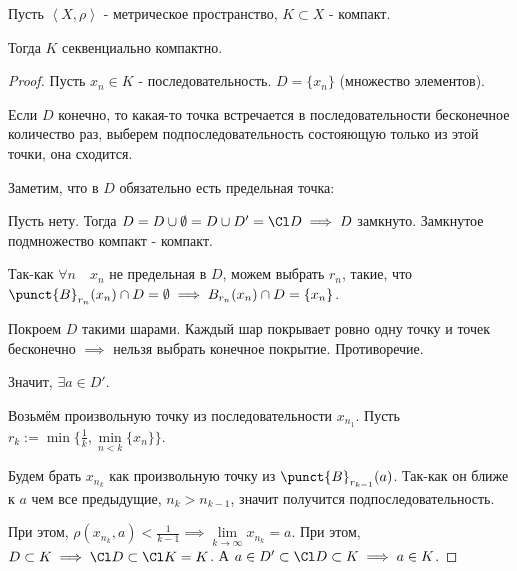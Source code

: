 \begin{theorem} \thmslashn

    Пусть $\left<X, \rho\right>$ - метрическое пространство, $K \subset X$ - компакт.

    Тогда $K$ секвенциально компактно.
    \begin{proof} \thmslashn
    
        Пусть $x_{n}\in K$ - последовательность. $D = \{x_{n}\}$ (множество элементов).

        Если $D$ конечно, то какая-то точка встречается в последовательности бесконечное количество раз, выберем подпоследовательность состояющую только из этой точки, она сходится.

        Заметим, что в $D$ обязательно есть предельная точка:

        Пусть нету. Тогда $D = D \cup \emptyset = D \cup D' = \Cl D \implies D$ замкнуто. Замкнутое подмножество компакт - компакт.

    Так-как $\forall{n}\quad x_{n}$ не предельная в $D$, можем выбрать $r_{n}$, такие, что $\punct{B}_{r_{n}}(x_{n})\cap D = \emptyset \implies B_{r_{n}}(x_{n})\cap D = \{x_{n}\} $.

        Покроем $D$ такими шарами. Каждый шар покрывает ровно одну точку и точек бесконечно $\implies$ нельзя выбрать конечное покрытие. Противоречие.

        Значит, $\exists{a\in D'}$.

        Возьмём произвольную точку из последовательности $x_{n_1}$. Пусть $r_{k} := \min \{\frac{1}{k}, \min\limits_{n < k} \{x_{n}\} \} $.

        Будем брать $x_{n_{k}}$ как произвольную точку из $\punct{B}_{r_{k-1}}(a)$. Так-как он ближе к $a$ чем все предыдущие, $n_{k} > n_{k-1}$, значит получится подпоследовательность.

        При этом, $\rho(x_{n_{k}}, a) < \frac{1}{k - 1} \implies \lim\limits_{k \to \infty} x_{n_{k}} = a$. При этом, $D \subset K \implies \Cl D \subset \Cl K = K$. А $a\in D' \subset \Cl D \subset K \implies a\in K$.
    \end{proof}
\end{theorem}
